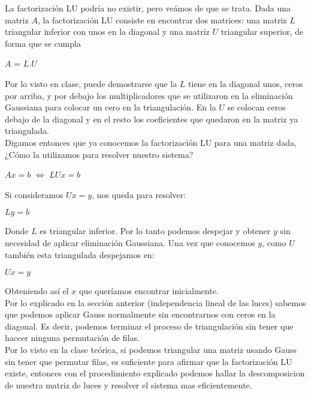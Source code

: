 La factorización LU podría no existir, pero veámos de que se trata. Dada una matriz $A$, la factorización LU consiste en encontrar dos matrices: una matriz $L$ triangular inferior con unos en la diagonal y una matriz $U$ triangular superior, de forma que se cumpla

\begin{center}
$A$ = $L$.$U$
\end{center}

Por lo visto en clase, puede demostrarse que la $L$ tiene en la diagonal unos, ceros por arriba, y por debajo los multiplicadores que se utilizaron en la eliminación Gaussiana para colocar un cero en la triangulación. En la $U$ se colocan ceros debajo de la diagonal y en el resto los coeficientes que quedaron en la matriz ya triangulada. \\

Digamos entonces que ya conocemos la factorización LU para una matriz dada, ¿Cómo la utilizamos para resolver nuestro sistema?

\begin{center}
    $Ax = b$ $\iff$ $LUx = b$
\end{center}

Si consideramos $Ux = y$, nos queda para resolver:

\begin{center}
    $Ly = b$
\end{center}

Donde $L$ es triangular inferior. Por lo tanto podemos despejar y obtener $y$ sin necesidad de aplicar eliminación Gaussiana. Una vez que conocemos $y$, como $U$ también esta triangulada despejamos en:

\begin{center}
    $Ux = y$
\end{center}

Obteniendo así el $x$ que queríamos encontrar inicialmente. \\

Por lo explicado en la sección anterior (independencia lineal de las luces) sabemos que podemos aplicar Gauss normalmente sin encontrarnos con ceros en la diagonal. Es decir, podemos terminar el proceso de triangulación sin tener que haccer ninguna permutación de filas. \\

Por lo visto en la clase teórica, si podemos triangular una matriz usando Gauss sin tener que permutar filas, es suficiente para afirmar que la factorización LU existe, entonces con el procedimiento explicado podemos hallar la descomposicion de nuestra matriz de luces y resolver el sistema mas eficientemente. \\

